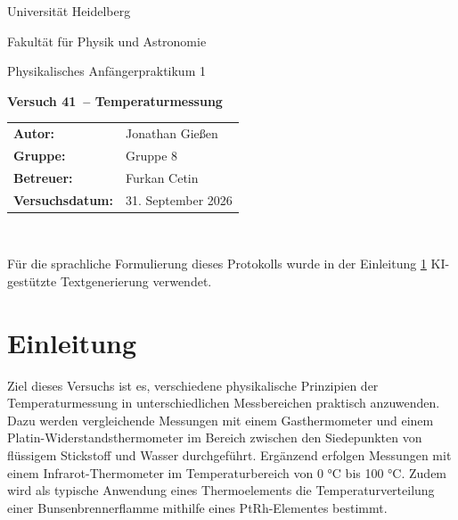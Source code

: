 \documentclass[12pt,a4paper,titlepage]{scrartcl}
\numberwithin{equation}{section}
\numberwithin{table}{section}
\numberwithin{figure}{section}
\newcommand{\versuch}{Versuch 41}
\newcommand{\titel}{Temperaturmessung}
\newcommand{\praktikum}{Physikalisches Anfängerpraktikum 1}
\newcommand{\autor}{Jonathan Gießen}
\newcommand{\gruppe}{Gruppe 8}
\newcommand{\datum}{31. September 2026}
\newcommand{\betreuer}{Furkan Cetin}
\begin{document}
\pagestyle{scrheadings}

\begin{titlepage}



    \centering
    \vspace*{4cm}
    {\large Universität Heidelberg\par}
    {\small Fakultät für Physik und Astronomie\par}
    {\Large \praktikum\par}
    \vspace{0.8cm}
    {\LARGE \bfseries \versuch\ -- \titel\par}
    \vspace{1.5cm}

    \begin{tabular}{ll}
        \textbf{Autor:} & \autor\\
        \textbf{Gruppe:} & \gruppe\\
        \textbf{Betreuer:} & \betreuer\\
        \textbf{Versuchsdatum:} & \datum\\
    \end{tabular}

    \vfill
    \hrulefill\
\end{titlepage}

\tableofcontents

\bigskip
\begin{tcolorbox}[colback=gray!5,colframe=gray!60,boxrule=0.8pt,arc=0.01mm,title=KI-Hinweis]
    Für die sprachliche Formulierung dieses Protokolls wurde in der Einleitung \ref{sec:Einleitung} KI-gestützte Textgenerierung verwendet. 
\end{tcolorbox}

\clearpage


\section{Einleitung}\label{sec:Einleitung}
Ziel dieses Versuchs ist es, verschiedene physikalische Prinzipien der Temperaturmessung in unterschiedlichen Messbereichen praktisch anzuwenden. Dazu werden vergleichende Messungen mit einem Gasthermometer und einem Platin-Widerstandsthermometer im Bereich zwischen den Siedepunkten von flüssigem Stickstoff und Wasser durchgeführt. Ergänzend erfolgen Messungen mit einem Infrarot-Thermometer im Temperaturbereich von 0 °C bis 100 °C. Zudem wird als typische Anwendung eines Thermoelements die Temperaturverteilung einer Bunsenbrennerflamme mithilfe eines PtRh-Elementes bestimmt.
\end{document}
